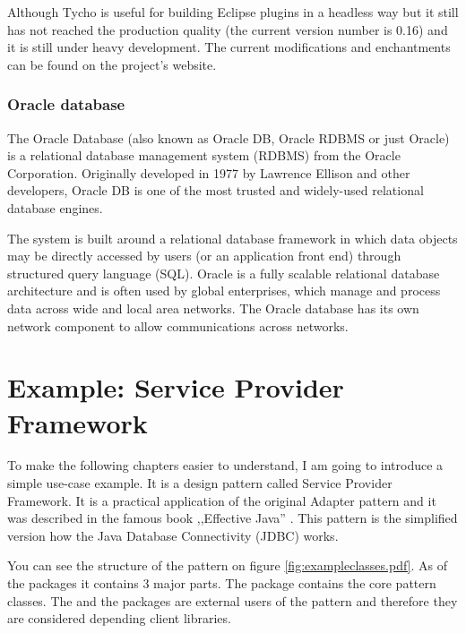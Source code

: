 Although Tycho is useful for building Eclipse plugins in a headless way but it
still has not reached the production quality (the current version number is
0.16) and it is still under heavy development. The current modifications and
enchantments can be found on the project's website.


\subsubsection{Oracle database}
The Oracle Database (also known as Oracle DB, Oracle RDBMS or just Oracle) is a
relational database management system (RDBMS) from the Oracle Corporation.
Originally developed in 1977 by Lawrence Ellison and other developers, Oracle DB
is one of the most trusted and widely-used relational database engines.

The system is built around a relational database framework in which data objects
may be directly accessed by users (or an application front end) through
structured query language (SQL). Oracle is a fully scalable relational database
architecture and is often used by global enterprises, which manage and process
data across wide and local area networks. The Oracle database has its own
network component to allow communications across networks.


\section{Example: Service Provider Framework}

To make the following chapters easier to understand, I am going to introduce a
simple use-case example. It is a design pattern called Service Provider
Framework. It is a practical application of the original Adapter pattern and it
was described in the famous book ,,Effective Java'' \cite{Bloch08}. This pattern
is the simplified version how the Java Database Connectivity (JDBC) works.


You can see the structure of the pattern on figure
\autoref{fig:exampleclasses.pdf}. As of the packages it contains 3 major parts.
The  package contains the core pattern classes. The 
and the  packages are external users of the pattern and therefore
they are considered depending client libraries.


